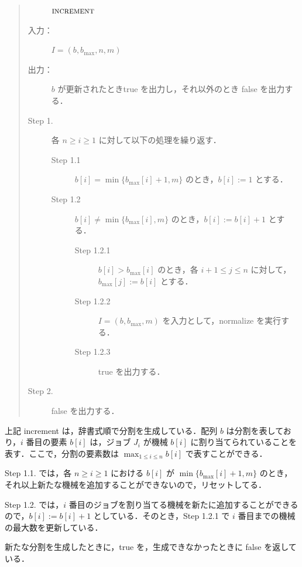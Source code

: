 \documentclass[12pt]{optlab-bachelor}
\begin{document}
\begin{quote}
  \begin{description}
    \item[]  ${\mbox {\bf{\sc increment}}}$
    \item[入力：] $I = (b,b_{\max},n, m)$
    \item[出力：] $b$ が更新されたとき{\sc true} を出力し，それ以外のとき {\sc false} を出力する．
  \end{description}
  \begin{description}
    \item[Step 1.] 各 $n \ge i \ge 1$ に対して以下の処理を繰り返す．
    \begin{description}
      \item[Step 1.1] $b[i] = \min\{b_{\max}[i] + 1, m\}$ のとき，$b[i] := 1$ とする．
      \item[Step 1.2] $b[i] \neq \min\{b_{\max}[i], m\}$ のとき，$b[i] := b[i] + 1$ とする．
      \begin{description}
        \item[Step 1.2.1] $b[i] > b_{\max}[i]$ のとき，各 $i + 1 \le j \le n$ に対して，$b_{\max}[j] := b[i]$ とする．
        \item[Step 1.2.2] $I = (b,b_{\max},m)$ を入力として，{\sc normalize} を実行する．
        \item[Step 1.2.3] {\sc true} を出力する．
      \end{description}
    \end{description}
    \item[Step 2.] {\sc false} を出力する．
  \end{description}
\end{quote}

上記 {\sc increment} は，辞書式順で分割を生成している．配列 $b$ は分割を表しており，$i$ 番目の要素 $b[i]$ は，ジョブ $J_i$ が機械 $b[i]$ に割り当てられていることを表す．ここで，分割の要素数は $\displaystyle \max_{1 \le i \le n}b[i]$ で表すことができる．

Step 1.1. では，各 $n \ge i \ge 1$ における $b[i]$ が $\min\{b_{\max}[i] + 1, m\}$ のとき，それ以上新たな機械を追加することができないので，リセットしてる．

Step 1.2. では，$i$ 番目のジョブを割り当てる機械を新たに追加することができるので，$b[i] := b[i] + 1$ としている．そのとき，Step 1.2.1 で $i$ 番目までの機械の最大数を更新している．

新たな分割を生成したときに，{\sc true} を，生成できなかったときに {\sc false} を返している．
\end{document}
